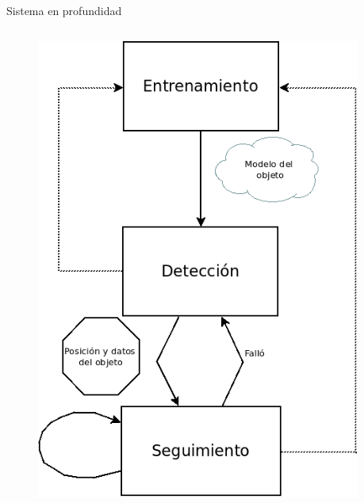 \documentclass[]{beamer}
\begin{document}
\begin{frame}[fragile]{Sistema en profundidad}
    \begin{columns}
        \begin{column}{5cm}
            \begin{figure}
                \centering
                \vspace{-15pt}
                \includegraphics[scale=0.3]{img/esquema_seguimiento.png}
            \end{figure}
        \end{column}

        \begin{column}{0.5cm}
        \end{column}


\end{columns}
\end{frame}
\end{document}
